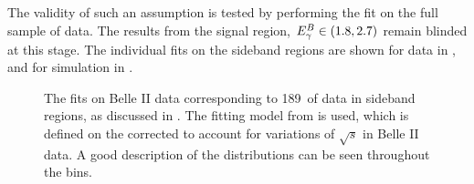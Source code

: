 The validity of such an assumption is tested by performing the \Mbc fit on the full sample of data. 
The results from the signal region, ${E^B_{\gamma}}\in(1.8,2.7)$ remain blinded at this stage.
The individual \Mbc fits on the \EB sideband regions are shown for data in , and for simulation in .
\begin{figure}[htbp!]
    \centering
    \caption{\label{fig:sideband_data_fit}    
    The \Mbc fits on Belle II data corresponding to 189~\invfb of data in \EB sideband regions,
    as discussed in .
    The fitting model from  is used,
    which is defined on the corrected \Mbc to account for variations of $\sqrt{s}$ in Belle II data.
    A good description of the \Mbc distributions can be seen throughout the \EB bins.
    }
\end{figure}
